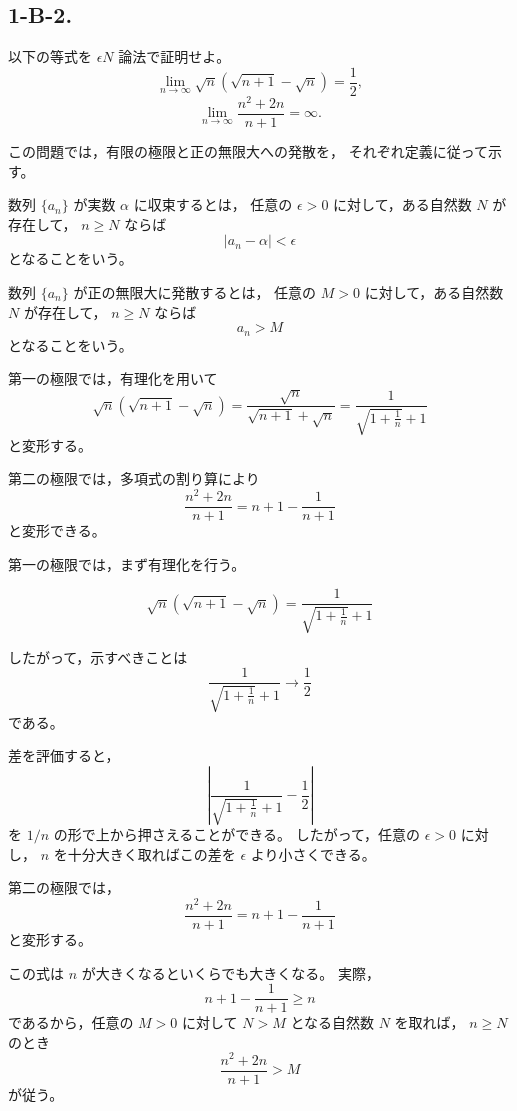\subsection{1-B-2.}
\begin{exercise}
	以下の等式を $\epsilon N$ 論法で証明せよ。
	\[
		\lim_{n\to\infty}
		\sqrt{n}\left(\sqrt{n+1}-\sqrt{n}\right)
		=
		\frac{1}{2},
	\]
	\[
		\lim_{n\to\infty}
		\frac{n^2+2n}{n+1}
		=
		\infty.
	\]
\end{exercise}
\begin{background}
	この問題では，有限の極限と正の無限大への発散を，
	それぞれ定義に従って示す。

	\begin{definition}[数列の収束]
		数列 $\{a_n\}$ が実数 $\alpha$ に収束するとは，
		任意の $\epsilon>0$ に対して，ある自然数 $N$ が存在して，
		$n\geq N$ ならば
		\[
			|a_n-\alpha|<\epsilon
		\]
		となることをいう。
	\end{definition}

	\begin{definition}[正の無限大への発散]
		数列 $\{a_n\}$ が正の無限大に発散するとは，
		任意の $M>0$ に対して，ある自然数 $N$ が存在して，
		$n\geq N$ ならば
		\[
			a_n>M
		\]
		となることをいう。
	\end{definition}

	\begin{remark}
		第一の極限では，有理化を用いて
		\[
			\sqrt{n}(\sqrt{n+1}-\sqrt{n})
			=
			\frac{\sqrt{n}}{\sqrt{n+1}+\sqrt{n}}
			=
			\frac{1}{\sqrt{1+\frac{1}{n}}+1}
		\]
		と変形する。

		第二の極限では，多項式の割り算により
		\[
			\frac{n^2+2n}{n+1}
			=
			n+1-\frac{1}{n+1}
		\]
		と変形できる。
	\end{remark}
\end{background}
\begin{strategy}
	第一の極限では，まず有理化を行う。

	\[
		\sqrt{n}(\sqrt{n+1}-\sqrt{n})
		=
		\frac{1}{\sqrt{1+\frac{1}{n}}+1}
	\]

	したがって，示すべきことは
	\[
		\frac{1}{\sqrt{1+\frac{1}{n}}+1}
		\to
		\frac{1}{2}
	\]
	である。

	差を評価すると，
	\[
		\left|
			\frac{1}{\sqrt{1+\frac{1}{n}}+1}
			-
			\frac{1}{2}
		\right|
	\]
	を $1/n$ の形で上から押さえることができる。
	したがって，任意の $\epsilon>0$ に対し，
	$n$ を十分大きく取ればこの差を $\epsilon$ より小さくできる。

	第二の極限では，
	\[
		\frac{n^2+2n}{n+1}
		=
		n+1-\frac{1}{n+1}
	\]
	と変形する。

	この式は $n$ が大きくなるといくらでも大きくなる。
	実際，
	\[
		n+1-\frac{1}{n+1}\geq n
	\]
	であるから，任意の $M>0$ に対して $N>M$ となる自然数 $N$ を取れば，
	$n\geq N$ のとき
	\[
		\frac{n^2+2n}{n+1}>M
	\]
	が従う。
\end{strategy}
